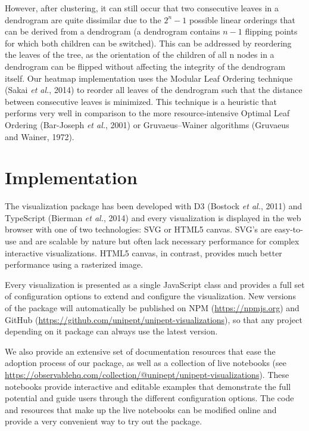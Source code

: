However, after clustering, it can still occur that two consecutive
leaves in a dendrogram are quite dissimilar due to the \(2^n−1\)
possible linear orderings that can be derived from a dendrogram (a
dendrogram contains \(n - 1\) flipping points for which both children
can be switched). This can be addressed by reordering the leaves of the
tree, as the orientation of the children of all n nodes in a dendrogram
can be flipped without affecting the integrity of the dendrogram itself.
Our heatmap implementation uses the Modular Leaf Ordering technique
(Sakai \emph{et al.}, 2014) to reorder all leaves of the dendrogram such
that the distance between consecutive leaves is minimized. This
technique is a heuristic that performs very well in comparison to the
more resource-intensive Optimal Leaf Ordering (Bar-Joseph \emph{et al.},
2001) or Gruvaeus--Wainer algorithms (Gruvaeus and Wainer, 1972).

\hypertarget{implementation-2}{%
\section{Implementation}\label{implementation-2}}

The visualization package has been developed with D3 (Bostock \emph{et
al.}, 2011) and TypeScript (Bierman \emph{et al.}, 2014) and every
visualization is displayed in the web browser with one of two
technologies: SVG or HTML5 canvas. SVG's are easy-to-use and are
scalable by nature but often lack necessary performance for complex
interactive visualizations. HTML5 canvas, in contrast, provides much
better performance using a rasterized image.

Every visualization is presented as a single JavaScript class and
provides a full set of configuration options to extend and configure the
visualization. New versions of the package will automatically be
published on NPM (\url{https://npmjs.org}) and GitHub
(\url{https://github.com/unipept/unipept-visualizations}), so that any
project depending on it package can always use the latest version.

We also provide an extensive set of documentation resources that ease
the adoption process of our package, as well as a collection of live
notebooks (see
\url{https://observablehq.com/collection/@unipept/unipept-visualizations}).
These notebooks provide interactive and editable examples that
demonstrate the full potential and guide users through the different
configuration options. The code and resources that make up the live
notebooks can be modified online and provide a very convenient way to
try out the package.

